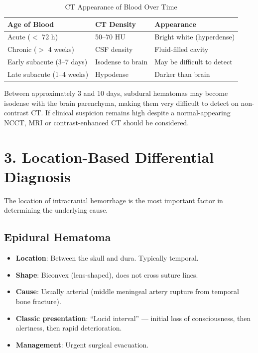 \begin{table}[h]
\centering
\begin{tabular}{l l l}
\hline
\textbf{Age of Blood} & \textbf{CT Density} & \textbf{Appearance} \\
\hline
Acute ($<$ 72 h) & 50--70 HU & Bright white (hyperdense) \\
Chronic ($>$ 4 weeks) & CSF density & Fluid-filled cavity \\
Early subacute (3--7 days) & Isodense to brain & May be difficult to detect \\
Late subacute (1--4 weeks) & Hypodense & Darker than brain \\
\hline
\end{tabular}
\caption{CT Appearance of Blood Over Time}
\end{table}

\begin{pearlbox}
Between approximately 3 and 10 days, subdural hematomas may become isodense with the brain parenchyma, making them very difficult to detect on non-contrast CT. If clinical suspicion remains high despite a normal-appearing NCCT, MRI or contrast-enhanced CT should be considered.
\end{pearlbox}


\section{3. Location-Based Differential Diagnosis}

The location of intracranial hemorrhage is the most important factor in determining the underlying cause.

\subsection{Epidural Hematoma}
\begin{itemize}
  \item \textbf{Location}: Between the skull and dura. Typically temporal.
  \item \textbf{Shape}: Biconvex (lens-shaped), does not cross suture lines.
  \item \textbf{Cause}: Usually arterial (middle meningeal artery rupture from temporal bone fracture).
  \item \textbf{Classic presentation}: ``Lucid interval'' --- initial loss of consciousness, then alertness, then rapid deterioration.
  \item \textbf{Management}: Urgent surgical evacuation.
\end{itemize}

